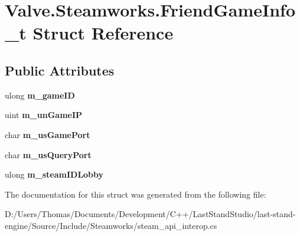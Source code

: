 \hypertarget{structValve_1_1Steamworks_1_1FriendGameInfo__t}{}\section{Valve.\+Steamworks.\+Friend\+Game\+Info\+\_\+t Struct Reference}
\label{structValve_1_1Steamworks_1_1FriendGameInfo__t}
\subsection*{Public Attributes}
\begin{DoxyCompactItemize}
\item 
\hypertarget{structValve_1_1Steamworks_1_1FriendGameInfo__t_a125da0694a5720ec6a8973b4211fdf8e}{}ulong {\bfseries m\+\_\+game\+I\+D}\label{structValve_1_1Steamworks_1_1FriendGameInfo__t_a125da0694a5720ec6a8973b4211fdf8e}

\item 
\hypertarget{structValve_1_1Steamworks_1_1FriendGameInfo__t_ab059035d8e16b3407d79748a73f50486}{}uint {\bfseries m\+\_\+un\+Game\+I\+P}\label{structValve_1_1Steamworks_1_1FriendGameInfo__t_ab059035d8e16b3407d79748a73f50486}

\item 
\hypertarget{structValve_1_1Steamworks_1_1FriendGameInfo__t_a8f0ad3060aaaf1641abf8a5e69676889}{}char {\bfseries m\+\_\+us\+Game\+Port}\label{structValve_1_1Steamworks_1_1FriendGameInfo__t_a8f0ad3060aaaf1641abf8a5e69676889}

\item 
\hypertarget{structValve_1_1Steamworks_1_1FriendGameInfo__t_a1c6b16ca4cc246c48663d65a4afce4b3}{}char {\bfseries m\+\_\+us\+Query\+Port}\label{structValve_1_1Steamworks_1_1FriendGameInfo__t_a1c6b16ca4cc246c48663d65a4afce4b3}

\item 
\hypertarget{structValve_1_1Steamworks_1_1FriendGameInfo__t_a7c642b0506bfdd3a098cb933e989fffe}{}ulong {\bfseries m\+\_\+steam\+I\+D\+Lobby}\label{structValve_1_1Steamworks_1_1FriendGameInfo__t_a7c642b0506bfdd3a098cb933e989fffe}

\end{DoxyCompactItemize}


The documentation for this struct was generated from the following file\+:\begin{DoxyCompactItemize}
\item 
D\+:/\+Users/\+Thomas/\+Documents/\+Development/\+C++/\+Last\+Stand\+Studio/last-\/stand-\/engine/\+Source/\+Include/\+Steamworks/steam\+\_\+api\+\_\+interop.\+cs\end{DoxyCompactItemize}
